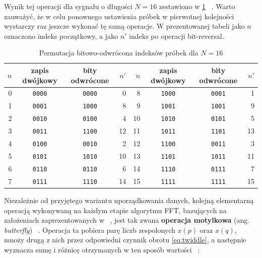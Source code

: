 Wynik tej operacji dla sygnału o długości $N = 16$ zestawiono w \cref{tab:bit_reversal} ~\cite{ZielinskiDSP}. Warto zauważyć, że w celu ponownego ustawienia próbek w pierwotnej kolejności wystarczy raz jeszcze wykonać tę samą operacje. W prezentowanej tabeli jako $n$ oznaczono indeks początkowy, a jako  $n'$ indeks po operacji bit-reversal.
\begin{table}[ht]
    \centering
    \caption{Permutacja bitowo-odwrócona indeksów próbek dla $N = 16$}
    \label{tab:bit_reversal}
    \begin{tabular}{@{}rccr@{\hspace{2.5em}}rccr@{}}
        \toprule
        $n$ & zapis dwójkowy & bity odwrócone & $n'$ &
        $n$ & zapis dwójkowy & bity odwrócone & $n'$ \\
        \midrule
        0 & \texttt{0000} & \texttt{0000} & 0  &  8  & \texttt{1000} & \texttt{0001} & 1  \\
        1 & \texttt{0001} & \texttt{1000} & 8  &  9  & \texttt{1001} & \texttt{1001} & 9  \\
        2 & \texttt{0010} & \texttt{0100} & 4  &  10 & \texttt{1010} & \texttt{0101} & 5  \\
        3 & \texttt{0011} & \texttt{1100} & 12 &  11 & \texttt{1011} & \texttt{1101} & 13 \\
        4 & \texttt{0100} & \texttt{0010} & 2  &  12 & \texttt{1100} & \texttt{0011} & 3  \\
        5 & \texttt{0101} & \texttt{1010} & 10 &  13 & \texttt{1101} & \texttt{1011} & 11 \\
        6 & \texttt{0110} & \texttt{0110} & 6  &  14 & \texttt{1110} & \texttt{0111} & 7  \\
        7 & \texttt{0111} & \texttt{1110} & 14 &  15 & \texttt{1111} & \texttt{1111} & 15 \\
        \bottomrule
    \end{tabular}
\end{table}

Niezależnie od przyjętego wariantu uporządkowania danych, kolejną elementarną operacją wykonywaną na każdym etapie algorytmu FFT, bazujących na założeniach zaprezentowanych w ~\cite{CooleyTurkeyFFT}, jest tak zwana \textbf{operacja motylkowa} (ang. \textit{butterfly}) ~\cite{ZielinskiDSP}. Operacja ta pobiera parę liczb zespolonych $x(p)$ oraz $x(q)$, mnoży drugą z nich przez odpowiedni czynnik obrotu \eqref{eq:twiddle}, a następnie wyznacza sumę i różnicę otrzymanych w ten sposób wartości ~\cite{CormenIntroductionAlgorithms}:

